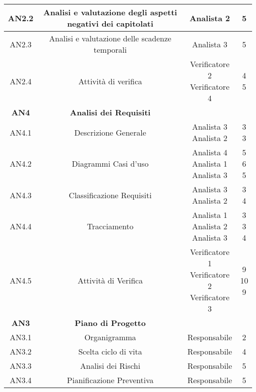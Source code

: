 \documentclass{scalatekids-article}
\begin{document}
\begin{center}
\begin{tabular}{| c | c | c | c |}
    \hline
    AN2.2 & Analisi e valutazione degli aspetti negativi dei capitolati & Analista 2 & 5\\
    \hline
    AN2.3 & Analisi e valutazione delle scadenze temporali & Analista 3 & 5\\
    \hline
    AN2.4 & Attività di verifica & \multiLineCell[t]{Verificatore 2\\Verificatore 4} & \multiLineCell[t]{4\\5}\\
    \hline
    \textbf{AN4} & \textbf{Analisi dei Requisiti} & &\\
    \hline
    AN4.1 & Descrizione Generale & \multiLineCell[t]{Analista 3\\Analista 2} & \multiLineCell[t]{3\\3}\\
    \hline
    AN4.2 & Diagrammi Casi d'uso & \multiLineCell[t]{Analista 4\\Analista 1\\Analista 3} & \multiLineCell[t]{5\\6\\5}\\
    \hline
    AN4.3 & Classificazione Requisiti & \multiLineCell[t]{Analista 3\\Analista 2} & \multiLineCell[t]{3\\4}\\
    \hline
    AN4.4 & Tracciamento & \multiLineCell[t]{Analista 1\\Analista 2\\Analista 3} & \multiLineCell[t]{3\\3\\4}\\
    \hline
    AN4.5 & Attività di Verifica & \multiLineCell[t]{Verificatore 1\\Verificatore 2\\Verificatore 3} & \multiLineCell[t]{9\\10\\9}\\
    \hline
    \textbf{AN3} & \textbf{Piano di Progetto} & &\\
    \hline
    AN3.1 & Organigramma & Responsabile & 2\\
    \hline
    AN3.2 & Scelta ciclo di vita & Responsabile & 4\\
    \hline
    AN3.3 & Analisi dei Rischi & Responsabile & 5\\
    \hline
    AN3.4 & Pianificazione Preventiva & Responsabile & 5\\

\end{tabular}
\end{center}
\end{document}
